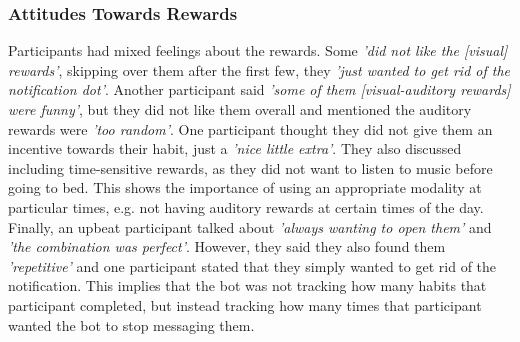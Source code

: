 \subsubsection*{Attitudes Towards Rewards}
Participants had mixed feelings about the rewards. Some \textit{'did not like the [visual] rewards'}, skipping over them after the first few, they \textit{'just wanted to get rid of the notification dot'}. Another participant said \textit{'some of them [visual-auditory rewards] were funny'}, but they did not like them overall and mentioned the auditory rewards were \textit{'too random'}. One participant thought they did not give them an incentive towards their habit, just a \textit{'nice little extra'}. They also discussed including time-sensitive rewards, as they did not want to listen to music before going to bed. This shows the importance of using an appropriate modality at particular times, e.g. not having auditory rewards at certain times of the day. Finally, an upbeat participant talked about \textit{'always wanting to open them'} and \textit{'the combination was perfect'}. However, they said they also found them \textit{'repetitive'} and one participant stated that they simply wanted to get rid of the notification. This implies that the bot was not tracking how many habits that participant completed, but instead tracking how many times that participant wanted the bot to stop messaging them.

